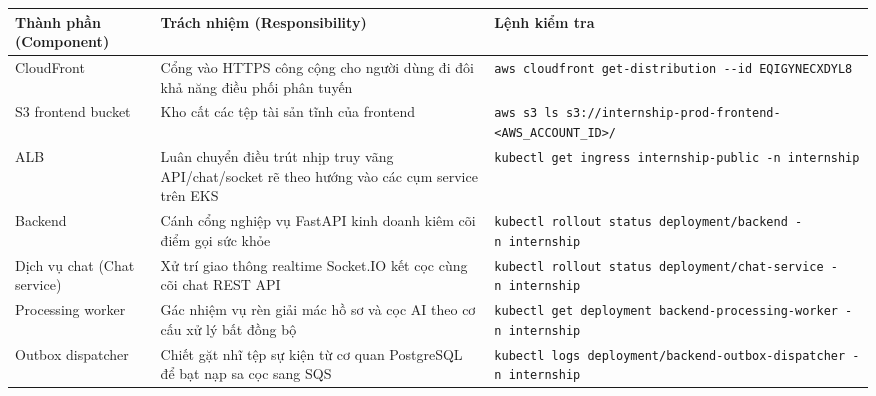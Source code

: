 {
\begingroup
\small
\setlength{\tabcolsep}{3pt}
\renewcommand{\arraystretch}{1.15}
\begin{longtable}{@{}
  >{\raggedright\arraybackslash}p{}
  >{\raggedright\arraybackslash}p{}
  >{\raggedright\arraybackslash}p{}@{}}
\toprule\noalign{}
\begin{minipage}[b]{\linewidth}\raggedright
Thành phần (Component)
\end{minipage} & \begin{minipage}[b]{\linewidth}\raggedright
Trách nhiệm (Responsibility)
\end{minipage} & \begin{minipage}[b]{\linewidth}\raggedright
Lệnh kiểm tra
\end{minipage} \\
\midrule\noalign{}
\endhead
\bottomrule\noalign{}
\endlastfoot
CloudFront & Cổng vào HTTPS công cộng cho người dùng đi đôi khả năng
điều phối phân tuyến &
\texttt{aws\ cloudfront\ get-\allowbreak{}distribution\ -\/\allowbreak{}-id\ EQIGYNECXDYL8} \\
S3 frontend bucket & Kho cất các tệp tài sản tĩnh của frontend &
\texttt{aws\ s3\ ls\ s3:/\allowbreak{}/\allowbreak{}internship-\allowbreak{}prod-\allowbreak{}frontend-\textless{}AWS\_\allowbreak{}ACCOUNT\_\allowbreak{}ID\textgreater{}/\allowbreak{}} \\
ALB & Luân chuyển điều trút nhịp truy vãng API/chat/socket rẽ theo hướng
vào các cụm service trên EKS &
\texttt{kubectl\ get\ ingress\ internship-\allowbreak{}public\ -n\ internship} \\
Backend & Cánh cổng nghiệp vụ FastAPI kinh doanh kiêm cõi điểm gọi sức
khỏe &
\texttt{kubectl\ rollout\ status\ deployment/\allowbreak{}backend\ -n\ internship} \\
Dịch vụ chat (Chat service) & Xử trí giao thông realtime Socket.IO kết
cọc cùng cõi chat REST API &
\texttt{kubectl\ rollout\ status\ deployment/\allowbreak{}chat-\allowbreak{}service\ -n\ internship} \\
Processing worker & Gác nhiệm vụ rèn giải mác hồ sơ và cọc AI theo cơ
cấu xử lý bất đồng bộ &
\texttt{kubectl\ get\ deployment\ backend-\allowbreak{}processing-\allowbreak{}worker\ -n\ internship} \\
Outbox dispatcher & Chiết gặt nhĩ tệp sự kiện từ cơ quan PostgreSQL để
bạt nạp sa cọc sang SQS &
\texttt{kubectl\ logs\ deployment/\allowbreak{}backend-\allowbreak{}outbox-\allowbreak{}dispatcher\ -n\ internship} \\

\end{longtable}}
